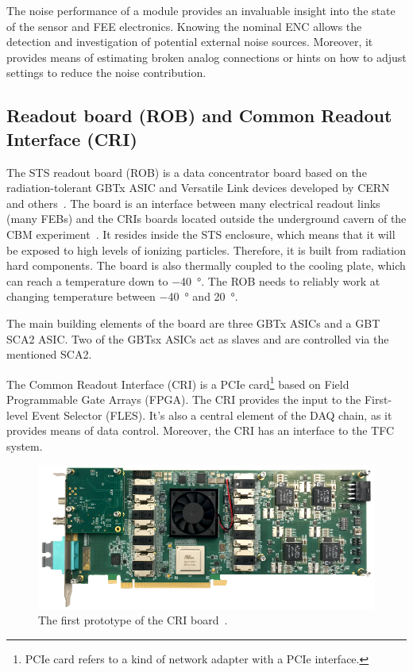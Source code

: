 The noise performance of a module provides an invaluable insight into the state of the sensor and \gls{FEE} electronics. Knowing the nominal \gls{ENC} allows the detection and investigation of potential external noise sources. Moreover, it provides means of estimating broken analog connections or hints on how to adjust settings to reduce the noise contribution.
\subsection{Readout board (ROB) and Common Readout Interface (CRI)}

The \gls{STS} readout board (\gls{ROB}) is a data concentrator board based on the radiation-tolerant GBTx ASIC and Versatile Link
devices developed by CERN and others~\cite{Bonacini:1235849, C_2013}. The board is an interface between many electrical readout links (many \glspl{FEB}) and the \glspl{CRI} boards located outside the underground cavern of the \gls{CBM} experiment~\cite{Lehnert_2017}. It resides inside the \gls{STS} enclosure, which means that it will be exposed to high levels of ionizing particles. Therefore, it is built from radiation hard components. The board is also thermally coupled to the cooling plate, which can reach a temperature down to \SI{-40}{\degree}. The \gls{ROB} needs to reliably work at changing temperature between \SI{-40}{\degree} and \SI{20}{\degree}. 

The main building elements of the board are three \gls{GBT}x \glspl{ASIC} and a \gls{GBT} \gls{SCA2} \gls{ASIC}. Two of the \glspl{GBT}x \glspl{ASIC} act as slaves and are controlled via the mentioned \gls{SCA2}. 

The Common Readout Interface (\gls{CRI}) is a PCIe card\footnote{PCIe card refers to a kind of network adapter with a PCIe interface.} based on Field Programmable Gate Arrays (\gls{FPGA}). The \gls{CRI} provides the input to the First-level Event Selector (\gls{FLES}). It's also a central element of the \gls{DAQ} chain, as it provides means of data control. Moreover, the \gls{CRI} has an interface to the \gls{TFC} system. 
\begin{figure}[!h]
\centering
\includegraphics[width=0.8\columnwidth]{Chapter2/images/cri_board_atlas.pdf}
\caption{The first prototype of the \gls{CRI} board~\cite{CRI}.}
\label{fig_cri_board}
\end{figure}



